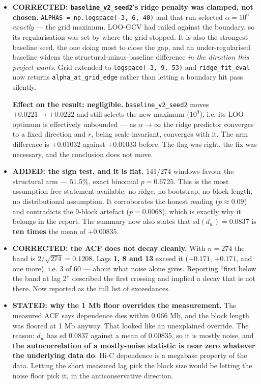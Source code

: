 \documentclass[11pt,a4paper]{article}
\newcommand{\code}[1]{\texttt{\small #1}}
\begin{document}
\begin{itemize}

\item \textbf{CORRECTED: \code{baseline\_v2\_seed2}'s ridge penalty was clamped,
not chosen.} \code{ALPHAS = np.logspace(-3, 6, 40)} and that run selected
$\alpha = 10^{6}$ \emph{exactly} --- the grid maximum. LOO-GCV had railed
against the boundary, so its regularisation was set by where the grid stopped.
It is also the strongest baseline seed, the one doing most to close the gap, and
an under-regularised baseline widens the structural-minus-baseline difference
\emph{in the direction this project wants}. Grid extended to
\code{logspace(-3, 9, 53)} and \code{ridge\_fit\_eval} now returns
\code{alpha\_at\_grid\_edge} rather than letting a boundary hit pass silently.

\textbf{Effect on the result: negligible.} \code{baseline\_v2\_seed2} moves
$+0.0221 \to +0.0222$ and still selects the new maximum ($10^{9}$), i.e. its
LOO optimum is effectively unbounded --- as $\alpha \to \infty$ the ridge
predictor converges to a fixed direction and $r$, being scale-invariant,
converges with it. The arm difference is $+0.01032$ against $+0.01033$ before.
The flag was right, the fix was necessary, and the conclusion does not move.

\item \textbf{ADDED: the sign test, and it is flat.} $141/274$ windows favour
the structural arm --- $51.5\%$, exact binomial $p = \mathbf{0.6725}$. This is
the most assumption-free statement available: no ridge, no bootstrap, no block
length, no distributional assumption. It corroborates the honest reading
($p \approx 0.09$) and contradicts the 9-block artefact ($p = 0.0068$), which is
exactly why it belongs in the report. The summary now also states that
$\mathrm{sd}(d_w) = 0.0837$ is \textbf{ten times} the mean of $+0.00835$.

\item \textbf{CORRECTED: the ACF does not decay cleanly.} With $n = 274$ the
band is $2/\sqrt{274} = 0.1208$. Lags \textbf{1, 8 and 13} exceed it
($+0.171$, $+0.171$, and one more), i.e. 3 of 60 --- about what noise alone
gives. Reporting ``first below the band at lag 2'' described the first crossing
and implied a decay that is not there. Now reported as the full list of
exceedances.

\item \textbf{STATED: why the 1 Mb floor overrides the measurement.} The
measured ACF says dependence dies within $0.066$ Mb, and the block length was
floored at 1 Mb anyway. That looked like an unexplained override. The reason:
$d_w$ has sd $0.0837$ against a mean of $0.00835$, so it is mostly noise, and
\textbf{the autocorrelation of a mostly-noise statistic is near zero whatever
the underlying data do}. Hi-C dependence is a megabase property of the data.
Letting the short measured lag pick the block size would be letting the noise
floor pick it, in the anticonservative direction.


\end{itemize}
\end{document}
